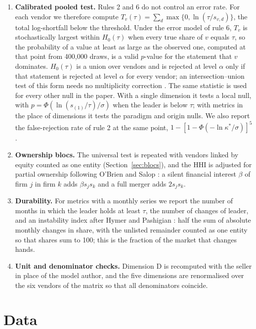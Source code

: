 \documentclass[11pt]{article}
\newcommand{\Hzero}{H_{0}}
\begin{document}
\begin{enumerate}
\item \textbf{Calibrated pooled test.} Rules 2 and 6 do not control an error rate. For each vendor we therefore compute $T_v(\tau)=\sum_d\max\{0,\ln(\tau/s_{v,d})\}$, the total log-shortfall below the threshold. Under the error model of rule 6, $T_v$ is stochastically largest within $\Hzero(\tau)$ when every true share of $v$ equals $\tau$, so the probability of a value at least as large as the observed one, computed at that point from 400{,}000 draws, is a valid $p$-value for the statement that $v$ dominates. $\Hzero(\tau)$ is a union over vendors and is rejected at level $\alpha$ only if that statement is rejected at level $\alpha$ for every vendor; an intersection--union test of this form needs no multiplicity correction \cite{berger1982multiparameter}. The same statistic is used for every other null in the paper. With a single dimension it tests a local null, with $p=\Phi(\ln(s_{(1)}/\tau)/\sigma)$ when the leader is below $\tau$; with metrics in the place of dimensions it tests the paradigm and origin nulls. We also report the false-rejection rate of rule 2 at the same point, $1-[1-\Phi(-\ln\kappa^{*}/\sigma)]^{5}$.
\item \textbf{Ownership blocs.} The universal test is repeated with vendors linked by equity counted as one entity (Section~\ref{sec:blocs}), and the HHI is adjusted for partial ownership following O'Brien and Salop \cite{obrien2000competitive}: a silent financial interest $\beta$ of firm $j$ in firm $k$ adds $\beta s_j s_k$ and a full merger adds $2s_js_k$.
\item \textbf{Durability.} For metrics with a monthly series we report the number of months in which the leader holds at least $\tau$, the number of changes of leader, and an instability index after Hymer and Pashigian \cite{hymer1962turnover}: half the sum of absolute monthly changes in share, with the unlisted remainder counted as one entity so that shares sum to 100; this is the fraction of the market that changes hands.
\item \textbf{Unit and denominator checks.} Dimension D is recomputed with the seller in place of the model author, and the five dimensions are renormalised over the six vendors of the matrix so that all denominators coincide.
\end{enumerate}

\section{Data}
\end{document}
